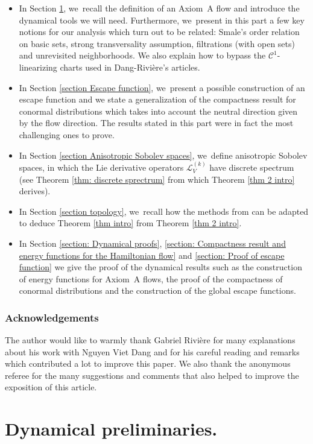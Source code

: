 \documentclass[JEP,XML,SOM,Unicode,NoEqCountersInSection,NoFloatCountersInSection,published]{cedram}
\theoremstyle{definition}
\theoremstyle{plain}
\newcommand{\Ccal}{\mathcal{C}}
\newcommand{\Lie}{\mathcal{L}}
\begin{document}
\begin{itemize}
\item In Section \ref{section Dynamical preliminaries}, we~recall the definition of an Axiom~A flow and introduce the dynamical tools we will need. Furthermore, we~present in this part a few key notions for our analysis which turn out to be related: Smale's order relation on basic sets, strong transversality assumption, filtrations (with open sets) and unrevisited neighborhoods. We also explain how to bypass the $\Ccal^1$-linearizing charts used in Dang-Rivière's articles.
\item In Section \ref{section Escape function}, we~present a possible construction of an escape function and we state a generalization of the compactness result for conormal distributions which takes into account the neutral direction given by the flow direction. The results stated in this part were in fact the most challenging ones to prove.
\item In Section \ref{section Anisotropic Sobolev spaces}, we~define anisotropic Sobolev spaces, in which the Lie derivative operators $\Lie_V^{(k)}$ have discrete spectrum (see Theorem \ref{thm: discrete sprectrum} from which Theorem \ref{thm 2 intro} derives).
\item In Section \ref{section topology}, we~recall how the methods from \cite{DR0, DRIII} can be adapted to deduce Theorem \ref{thm intro} from Theorem \ref{thm 2 intro}.
\item In Section \ref{section: Dynamical proofs}, \ref{section: Compactness result and energy functions for the Hamiltonian flow} and \ref{section: Proof of escape function} we give the proof of the dynamical results such as the construction of energy functions for Axiom~A flows, the proof of the compactness of conormal distributions and the construction of the global escape functions.
\end{itemize}

\subsubsection*{Acknowledgements} The author would like to warmly thank Gabriel Rivière for many explanations about his work with Nguyen Viet Dang and for his careful reading and remarks which contributed a lot to improve this paper. We also thank the anonymous referee for the many suggestions and comments that also helped to improve the exposition of this article.

\section{Dynamical preliminaries.}\label{section Dynamical preliminaries}
\end{document}
